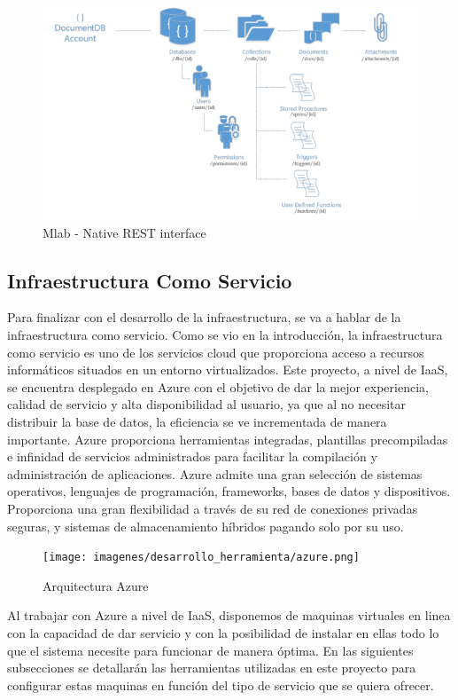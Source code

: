 \documentclass[a4paper,11pt]{book}
\begin{document}
\begin{figure}[H] 
\centering 
\includegraphics[scale=0.95]{imagenes/desarrollo_herramienta/mlab.png}
\caption{ Mlab - Native REST interface\cite{mlabL}  }  
\end{figure} 
  

\subsection{Infraestructura Como Servicio}
Para finalizar con el desarrollo de la infraestructura, se va a hablar de la infraestructura como servicio. Como se vio en la introducción, la infraestructura como servicio es uno de los servicios cloud que proporciona acceso a recursos informáticos situados en un entorno virtualizados. Este proyecto, a nivel de IaaS, se encuentra desplegado en Azure\cite{azure} con el objetivo de  dar la mejor experiencia, calidad de servicio y alta disponibilidad al usuario, ya que al no necesitar distribuir la base de datos, la eficiencia se ve incrementada de manera importante.
Azure proporciona herramientas integradas, plantillas precompiladas e infinidad de servicios administrados para facilitar la compilación y administración de aplicaciones. Azure admite una gran selección de sistemas operativos, lenguajes de programación, frameworks, bases de datos y dispositivos. Proporciona una gran flexibilidad a través de su red de conexiones privadas seguras, y sistemas de almacenamiento híbridos pagando solo por su uso. 

\begin{figure}[H] 
\centering 
\texttt{[image: imagenes/desarrollo\_herramienta/azure.png]}
\caption{ Arquitectura Azure\cite{azureA}  }  
\end{figure}

Al trabajar con Azure a nivel de IaaS, disponemos de maquinas virtuales en linea con la capacidad de dar servicio y con la posibilidad de instalar en ellas todo lo que el sistema necesite para funcionar de manera óptima. En las siguientes subsecciones se detallarán las herramientas utilizadas en este proyecto para configurar estas maquinas en función del tipo de servicio que se quiera ofrecer. 
\end{document}
